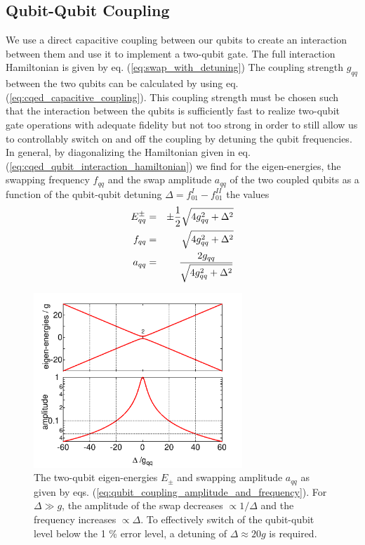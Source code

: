 \subsection{Qubit-Qubit Coupling}

We use a direct capacitive coupling between our qubits to create an interaction between them and use it to implement a two-qubit gate. The full interaction Hamiltonian is given by eq. (\ref{eq:swap_with_detuning}) The coupling strength $g_{qq}$ between the two qubits can be calculated by using eq. (\ref{eq:cqed_capacitive_coupling}). This coupling strength must be chosen such that the interaction between the qubits is sufficiently fast to realize two-qubit gate operations with adequate fidelity but not too strong in order to still allow us to controllably switch on and off the coupling by detuning the qubit frequencies. In general, by diagonalizing the Hamiltonian given in eq. (\ref{eq:cqed_qubit_interaction_hamiltonian}) we find for the eigen-energies, the swapping frequency $f_{qq}$ and the swap amplitude $a_{qq}$ of the two coupled qubits as a function of the qubit-qubit detuning $\Delta=f_{01}^I-f_{01}^{II}$ the values
%
\begin{eqnarray}
E_{qq}^\pm & = & \pm\frac{1}{2}\sqrt{4g_{qq}^2+\Delta^2} \notag \\
f_{qq}     & = & \sqrt{4g_{qq}^2+\Delta^2} \notag \\
a_{qq}     & = & \frac{2g_{qq}}{\sqrt{4g_{qq}^2+\Delta^2}} \label{eq:qubit_coupling_amplitude_and_frequency}
\end{eqnarray}
%

\begin{figure}
	\centering
	\includegraphics[width=0.7\textwidth]{./material/mathematica/qubit_qubit_coupling}
	\caption[]{The two-qubit eigen-energies $E_\pm$ and swapping amplitude $a_{qq}$ as given by eqs. (\ref{eq:qubit_coupling_amplitude_and_frequency}). For $\Delta \gg g$, the amplitude of the swap decreases $\propto 1/\Delta$ and the frequency increases $\propto \Delta$. To effectively switch of the qubit-qubit level below the 1 \% error level, a detuning of $\Delta \approx 20 g$ is required.}
	\label{fig:qubit_coupling_amplitude_and_frequency}
\end{figure}

